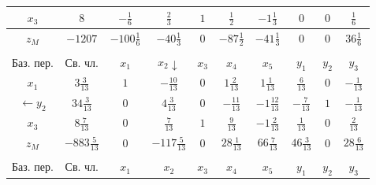 \documentclass[a4paper,14pt]{extarticle}
\begin{document}
\begin{center}
\begin{tabular}{|c|c|c|c|c|c|c|c|c|c|}
        \hline
        $x_3$            & $8$                & $-\frac{1}{6}$    & $\frac{2}{3}$      & $1$              & $\frac{1}{2}$    & $-1\frac{1}{3}$   & $0$               & $0$               & $\frac{1}{6}$     \\
        \hline
        $z_M$            & $-1207$            & $-100\frac{1}{6}$ & $-40\frac{1}{3}$   & $0$              & $-87\frac{1}{2}$ & $-41\frac{1}{3}$  & $0$               & $0$               & $36\frac{1}{6}$   \\
        \hline
        \multicolumn{10}{c}{}                                                                                                                                                                                \\
        \hline
        Баз. пер.        & Св. чл.            & $x_1$             & $x_2 \downarrow$   & $x_3$            & $x_4 $           & $x_5$             & $y_1$             & $y_2$             & $y_3$             \\
        \hline
        $x_1$            & $3\frac{3}{13}$    & $1$               & $-\frac{10}{13}$   & $0$              & $1\frac{2}{13}$  & $1\frac{1}{13}$   & $\frac{6}{13}$    & $0$               & $-\frac{1}{13}$   \\
        \hline
        $\leftarrow y_2$ & $34\frac{3}{13}$   & $0$               & $4\frac{3}{13}$    & $0$              & $-\frac{11}{13}$ & $-1\frac{12}{13}$ & $-\frac{7}{13}$   & $1$               & $-\frac{1}{13}$   \\
        \hline
        $x_3$            & $8\frac{7}{13}$    & $0$               & $\frac{7}{13}$     & $1$              & $\frac{9}{13}$   & $-1\frac{2}{13}$  & $\frac{1}{13}$    & $0$               & $\frac{2}{13}$    \\
        \hline
        $z_M$            & $-883\frac{5}{13}$ & $0$               & $-117\frac{5}{13}$ & $0$              & $28\frac{1}{13}$ & $66\frac{7}{13}$  & $46\frac{3}{13}$  & $0$               & $28\frac{6}{13}$  \\
        \hline
        \multicolumn{10}{c}{}                                                                                                                                                                                \\
        \hline
        Баз. пер.        & Св. чл.            & $x_1$             & $x_2$              & $x_3$            & $x_4 $           & $x_5$             & $y_1$             & $y_2$             & $y_3$             \\

\end{tabular}
\end{center}
\end{document}
